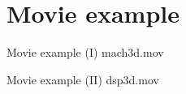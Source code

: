\section{Movie example}
\begin{frame}{Movie example (I)}
  \centering
  mach3d.mov
\end{frame}

\begin{frame}{Movie example (II)}
  \centering
  dsp3d.mov
\end{frame}
